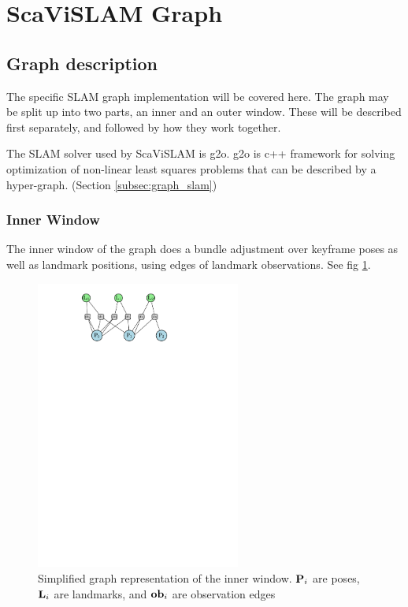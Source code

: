 \section{ScaViSLAM Graph}
\label{sec:scavislam_graph}

\subsection{Graph description}

The specific SLAM graph implementation will be covered here.  The graph may be split up into two parts, an inner and an outer window.  These will be described first separately, and followed by how they work together.

The SLAM solver used by ScaViSLAM is g2o.  g2o is c++ framework for solving optimization of non-linear least squares problems that can be described by a hyper-graph.  (Section \ref{subsec:graph_slam})

\subsubsection{Inner Window}

The inner window of the graph does a bundle adjustment over keyframe poses as well as landmark positions, using edges of landmark observations.  See fig \ref{fig:inner_window}.

\begin{figure}[h!]
  \centering
    \includegraphics[width=0.6\textwidth]{chapters/images/inner_window}
  \caption{Simplified graph representation of the inner window.  $\mathbf P_i$ are poses, $\mathbf L_i$ are landmarks, and $\mathbf {ob}_i$ are observation edges}
  \label{fig:inner_window}
\end{figure}

